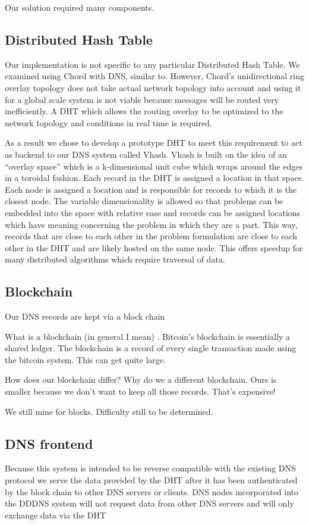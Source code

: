 \documentclass[11pt]{ieeetran} %
\begin{document}
Our solution required many components.

\subsection{Distributed Hash Table}
Our implementation is not specific to any particular Distributed Hash Table.  We examined using Chord \cite{chord} with DNS, similar to\cite{cox}.  However, Chord’s unidirectional ring overlay topology does not take actual network topology into account and using it for a global scale system is not viable because messages will be routed very inefficiently. A DHT which allows the routing overlay to be optimized to the network topology and conditions in real time is required.

As a result we chose to develop a prototype DHT to meet this requirement to act as backend to our DNS system called Vhash. Vhash is built on the idea of an “overlay space” which is a k-dimensional unit cube which wraps around the edges in a toroidal fashion. Each record in the DHT is assigned a location in that space. Each node is assigned a location and is responsible for records to which it is the closest node. The variable dimensionality is allowed so that problems can be embedded into the space with relative ease and records can be assigned locations which have meaning concerning the problem in which they are a part. This way, records that are close to each other in the problem formulation are close to each other in the DHT and are likely hosted on the same node. This offers speedup for many distributed algorithms which require traversal of data.

\subsection{Blockchain}
Our DNS records are kept via a block chain

What is a blockchain (in general I mean) \cite{bitcoin} \cite{namecoin}.
Bitcoin's blockchain is essentially a shared ledger.  The blockchain is a record of every single transaction made using the bitcoin system.  This can get quite large.

How does our blockchain differ?  Why do we a different blockchain.  Ours is smaller because we don't want to keep all those records. That's expensive! 

We still mine for blocks.  Difficulty still to be determined.


\subsection{DNS frontend}
Because this system is intended to be reverse compatible with the existing DNS protocol we serve the data provided by the DHT after it has been authenticated by the block chain to other DNS servers or clients. DNS nodes incorporated into the DDDNS system will not request data from other DNS servers and will only exchange data via the DHT 
\end{document}
